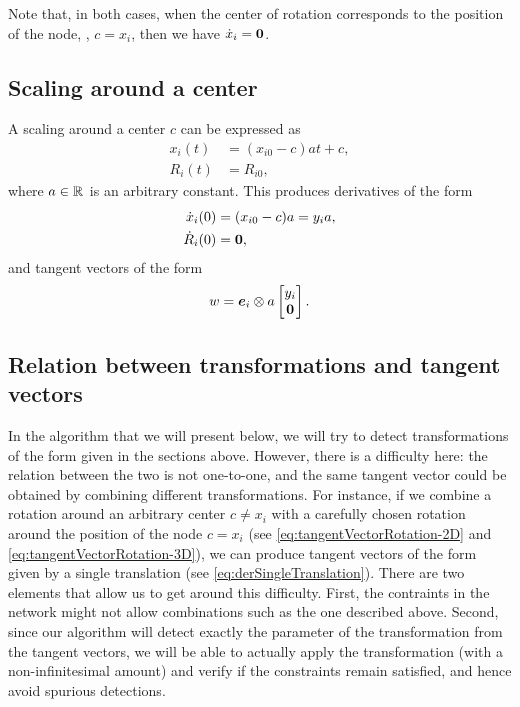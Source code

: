 \documentclass[12pt]{article}
\newcommand{\dx}{\dot{x}}
\newcommand{\Ri}{R_i}
\newcommand{\dxi}{\dot{x}_i}
\newcommand{\kron}{\otimes}
\begin{document}
Note that, in both cases, when the center of rotation corresponds to the position of the node, \ie, $c=x_i$, then we have $\dx_i=\vct{0}$.

\subsection{Scaling around a center}
A scaling around a center $c$ can be expressed as
\begin{equation}
\begin{aligned}
\label{eq:scaling}
  x_i(t)&=(x_{i0}-c)at+c,\\
  \Ri(t)&=R_{i0},
\end{aligned}
\end{equation}
where $a\in\mathbb{R}^{}{}$ is an arbitrary constant.
This produces derivatives of the form
\begin{equation}
\label{eq:derScaling}
\begin{aligned}
  \dxi(0)&=(x_{i0}-c)a=y_ia,\\
  \dRi(0)&=\vct{0},
\end{aligned}
\end{equation}
and tangent vectors of the form
\begin{equation}
  w=\vct{e}_i\kron a\bmat{y_i\\\vct{0}}.
\end{equation}


\subsection{Relation between transformations and tangent vectors}
In the algorithm that we will present below, we will try to detect transformations of the form given in the sections above. However, there is a difficulty here: the relation between the two is not one-to-one, and the same tangent vector could be obtained by combining different transformations. For instance, if we combine a rotation around an arbitrary center $c\neq x_i$ with a carefully chosen rotation around the position of the node $c=x_i$ (see \eqref{eq:tangentVectorRotation-2D} and \eqref{eq:tangentVectorRotation-3D}), we can produce tangent vectors of the form given by a single translation (see \eqref{eq:derSingleTranslation}). There are two elements that allow us to get around this difficulty. First, the contraints in the network might not allow combinations such as the one described above. Second, since our algorithm will detect exactly the parameter of the transformation from the tangent vectors, we will be able to actually apply the transformation (with a non-infinitesimal amount) and verify if the constraints remain satisfied, and hence avoid spurious detections.
 
\end{document}
